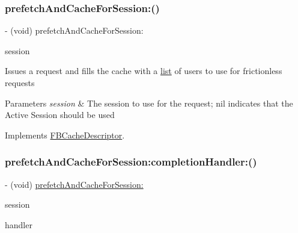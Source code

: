 \subsubsection{\texorpdfstring{prefetch\+And\+Cache\+For\+Session\+:()}{prefetchAndCacheForSession:()}\hspace{0.1cm}{\footnotesize\ttfamily [5/5]}}
{\footnotesize\ttfamily -\/ (void) prefetch\+And\+Cache\+For\+Session\+: \begin{DoxyParamCaption}\item[{(\hyperlink{interfaceFBSession}{F\+B\+Session} $\ast$)}]{session }\end{DoxyParamCaption}}

Issues a request and fills the cache with a \hyperlink{protocollist-p}{list} of users to use for frictionless requests


\begin{DoxyParams}{Parameters}
{\em session} & The session to use for the request; nil indicates that the Active Session should be used \\
\hline
\end{DoxyParams}


Implements \hyperlink{interfaceFBCacheDescriptor_a1d3bbb38753d402a6f08e9402904a8d6}{F\+B\+Cache\+Descriptor}.

\mbox{\label{interfaceFBFrictionlessRecipientCache_a4c4c0f1fd519bfff5b39f3433fad29e3}} 
\subsubsection{\texorpdfstring{prefetch\+And\+Cache\+For\+Session\+:completion\+Handler\+:()}{prefetchAndCacheForSession:completionHandler:()}\hspace{0.1cm}{\footnotesize\ttfamily [1/5]}}
{\footnotesize\ttfamily -\/ (void) \hyperlink{interfaceFBFrictionlessRecipientCache_a4f218828f2b6a8bb5a8e0044e98689dc}{prefetch\+And\+Cache\+For\+Session\+:} \begin{DoxyParamCaption}\item[{(\hyperlink{interfaceFBSession}{F\+B\+Session} $\ast$)}]{session }\item[{completionHandler:(F\+B\+Request\+Handler)}]{handler }\end{DoxyParamCaption}}

